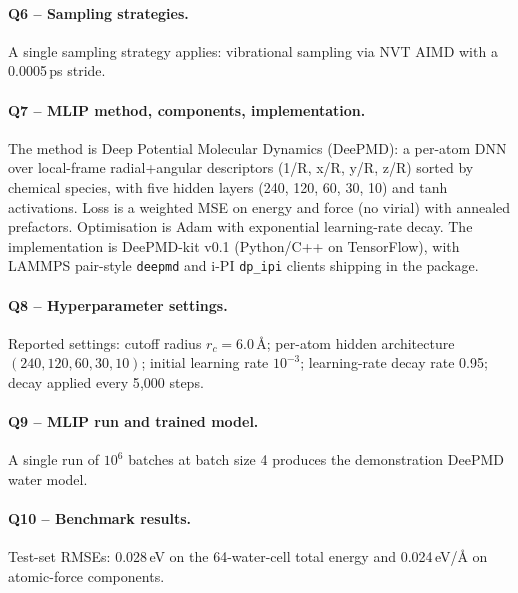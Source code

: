 \paragraph{Q6 -- Sampling strategies.}
A single sampling strategy applies: vibrational sampling via NVT
AIMD with a 0.0005\,ps stride.


\paragraph{Q7 -- MLIP method, components, implementation.}
The method is Deep Potential Molecular Dynamics (DeePMD): a per-atom
DNN over local-frame radial+angular descriptors (1/R, x/R, y/R,
z/R) sorted by chemical species, with five hidden layers (240, 120,
60, 30, 10) and tanh activations. Loss is a weighted MSE on energy
and force (no virial) with annealed prefactors. Optimisation is Adam
with exponential learning-rate decay. The implementation is
DeePMD-kit v0.1 (Python/C++ on TensorFlow), with LAMMPS pair-style
\texttt{deepmd} and i-PI \texttt{dp\_ipi} clients shipping in the
package.


\paragraph{Q8 -- Hyperparameter settings.}
Reported settings: cutoff radius $r_c = 6.0$\,\AA; per-atom hidden
architecture $(240, 120, 60, 30, 10)$; initial learning rate
$10^{-3}$; learning-rate decay rate 0.95; decay applied every 5{,}000
steps.


\paragraph{Q9 -- MLIP run and trained model.}
A single run of $10^6$ batches at batch size 4 produces the
demonstration DeePMD water model.


\paragraph{Q10 -- Benchmark results.}
Test-set RMSEs: 0.028\,eV on the 64-water-cell total energy and
0.024\,eV/\AA{} on atomic-force components.


